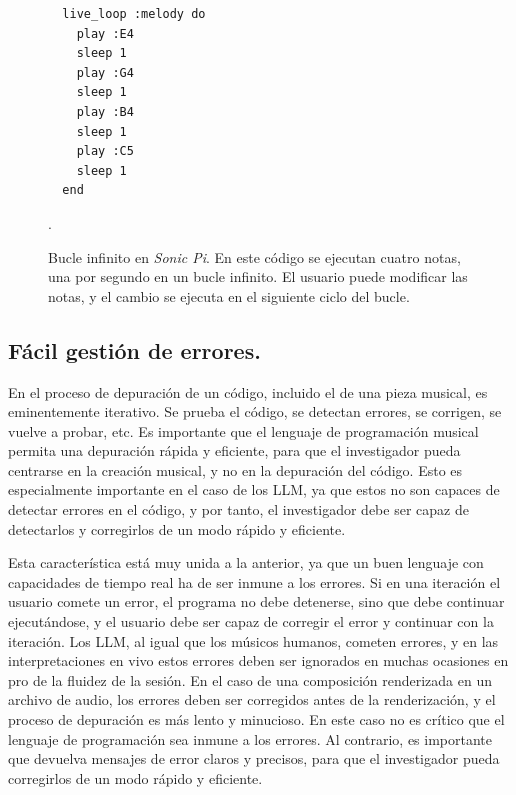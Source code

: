 \begin{figure}[h]
  \caption[Bucle infinito en \textit{Sonic Pi}]{Bucle infinito en \textit{Sonic Pi}. En este código se ejecutan cuatro notas, una por segundo en un bucle infinito. El usuario puede modificar las notas, y el cambio se ejecuta en el siguiente ciclo del bucle.}
  \centering
  \begin{mdframed}
  \begin{verbatim}
  live_loop :melody do
    play :E4
    sleep 1
    play :G4
    sleep 1
    play :B4
    sleep 1
    play :C5
    sleep 1
  end
  \end{verbatim}
  \end{mdframed}
  .
  \label{fig:sonic_pi_loop}
\end{figure}

\subsection{Fácil gestión de errores.} En el proceso de depuración de un código, incluido el de una pieza musical, es eminentemente iterativo. Se prueba el código, se detectan errores, se corrigen, se vuelve a probar, etc. Es importante que el lenguaje de programación musical permita una depuración rápida y eficiente, para que el investigador pueda centrarse en la creación musical, y no en la depuración del código. Esto es especialmente importante en el caso de los LLM, ya que estos no son capaces de detectar errores en el código, y por tanto, el investigador debe ser capaz de detectarlos y corregirlos de un modo rápido y eficiente.

Esta característica está muy unida a la anterior, ya que un buen lenguaje con capacidades de tiempo real ha de ser inmune a los errores. Si en una iteración el usuario comete un error, el programa no debe detenerse, sino que debe continuar ejecutándose, y el usuario debe ser capaz de corregir el error y continuar con la iteración. Los LLM, al igual que los músicos humanos, cometen errores, y en las interpretaciones en vivo estos errores deben ser ignorados en muchas ocasiones en pro de la fluidez de la sesión. En el caso de una composición renderizada en un archivo de audio, los errores deben ser corregidos antes de la renderización, y el proceso de depuración es más lento y minucioso. En este caso no es crítico que el lenguaje de programación sea inmune a los errores. Al contrario, es importante que devuelva mensajes de error claros y precisos, para que el investigador pueda corregirlos de un modo rápido y eficiente. 

